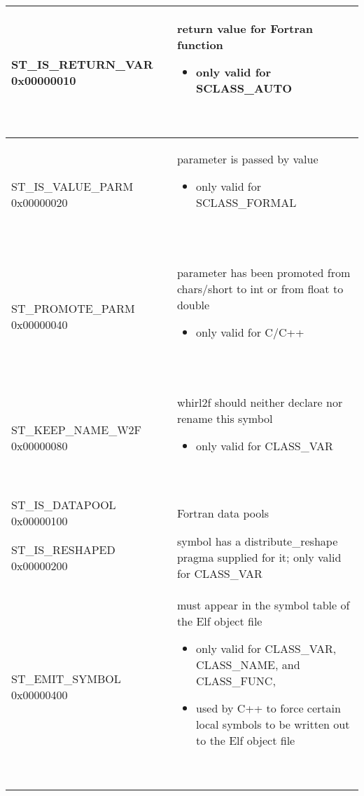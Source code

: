 \begin{longtable}{|p{2in}|p{4in}|}
\index{ST\_IS\_RETURN\_VAR}%
ST\_IS\_RETURN\_VAR 0x00000010 & 
\begin{minipage}{4in}
\flushleft
return value for Fortran function
\begin{itemize}
\item only valid for
\index{SCLASS\_AUTO}%
SCLASS\_AUTO
\end{itemize}
~
\end{minipage}\\\hline

\index{ST\_IS\_VALUE\_PARM}%
ST\_IS\_VALUE\_PARM 0x00000020 & 
\begin{minipage}{4in}
\flushleft
parameter is passed by value
\begin{itemize}
\item only valid for
\index{SCLASS\_FORMAL}%
SCLASS\_FORMAL
\end{itemize}
~
\end{minipage}\\\hline

\index{ST\_PROMOTE\_PARM}%
ST\_PROMOTE\_PARM 0x00000040 &
\begin{minipage}{4in}
\flushleft
parameter has been promoted from chars/short to int or from
float to double
\begin{itemize}
\item only valid for C/C++
\end{itemize}
~
\end{minipage}\\\hline

\index{ST\_KEEP\_NAME\_W2F}%
ST\_KEEP\_NAME\_W2F 0x00000080 &
\begin{minipage}{4in}
\flushleft
whirl2f should neither declare nor rename this symbol
\begin{itemize}
\item only valid for
\index{CLASS\_VAR}%
CLASS\_VAR
\end{itemize}
~
\end{minipage}\\\hline

\index{ST\_IS\_DATAPOOL}%
ST\_IS\_DATAPOOL 0x00000100 & Fortran data pools \\\hline

\index{ST\_IS\_RESHAPED}%
ST\_IS\_RESHAPED 0x00000200 & 
symbol has a distribute\_reshape pragma supplied for it; only valid for
CLASS\_VAR\\\hline

\index{ST\_EMIT\_SYMBOL}%
ST\_EMIT\_SYMBOL 0x00000400 &
\begin{minipage}{4in}
\flushleft
must appear in the symbol table of the Elf object file
\begin{itemize}
\item only valid for CLASS\_VAR, CLASS\_NAME, and CLASS\_FUNC,
\item used by C++ to force certain local symbols to be written 
out to the Elf object file 
\end{itemize}
~
\end{minipage}\\\hline


\end{longtable}
